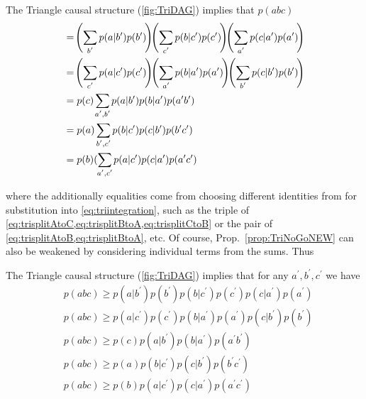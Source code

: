 \begin{proposition}\label{prop:TriNoGoNEW}The Triangle causal structure (\cref{fig:TriDAG}) implies that $p(abc)$
\begin{align*}
&=\!\left(\sum\limits_{\mathclap{b^{\prime}}}
p(a|b^{\prime})p(b^{\prime})
\!\right)\!\!\left(\sum\limits_{\mathclap{c^{\prime}}}
p(b|c^{\prime})p(c^{\prime})
\!\right)\!\!
\left(\sum\limits_{\mathclap{a^{\prime}}}
p(c|a^{\prime})p(a^{\prime})
\!\right)\\
&=\!\left(\sum\limits_{\mathclap{c^{\prime}}}
p(a|c^{\prime})p(c^{\prime})
\!\right)\!\!\left(\sum\limits_{\mathclap{a^{\prime}}}
p(b|a^{\prime})p(a^{\prime})
\!\right)\!\!
\left(\sum\limits_{\mathclap{b^{\prime}}}
p(c|b^{\prime})p(b^{\prime})
\!\right)\\
&=p(c)\sum\limits_{\mathclap{a^{\prime},b^{\prime}}}
p(a|b^{\prime})p(b|a^{\prime})p(a^{\prime}b^{\prime})\\
&=p(a)\sum\limits_{\mathclap{b^{\prime},c^{\prime}}}
p(b|c^{\prime})p(c|b^{\prime})p(b^{\prime}c^{\prime})\\
&=p(b)(\sum\limits_{\mathclap{a^{\prime},c^{\prime}}}
p(a|c^{\prime})p(c|a^{\prime})p(a^{\prime}c^{\prime})
\end{align*}
\end{proposition}
where the additionally equalities come from choosing different identities from  for substitution into \cref{eq:triintegration}, such as the triple of \cref{eq:trisplitAtoC,eq:trisplitBtoA,eq:trisplitCtoB} or the pair of \cref{eq:trisplitAtoB,eq:trisplitBtoA}, etc.
Of course, Prop.~\ref{prop:TriNoGoNEW} can also be weakened by considering individual terms from the sums. Thus
\begin{corollary}\label{cor:TriNoGoNEW}The Triangle causal structure (\cref{fig:TriDAG}) implies that for any ${a^{\prime},b^{\prime},c^{\prime}}$ we have %
\begin{align*}
&p(abc) \geq p(a|b^{\prime})p(b^{\prime})p(b|c^{\prime})p(c^{\prime})p(c|a^{\prime})p(a^{\prime})\\
&p(abc) \geq p(a|c^{\prime})p(c^{\prime})p(b|a^{\prime})p(a^{\prime})p(c|b^{\prime})p(b^{\prime})\\
&p(abc) \geq p(c)p(a|b^{\prime})p(b|a^{\prime})p(a^{\prime}b^{\prime})\\
&p(abc) \geq p(a)p(b|c^{\prime})p(c|b^{\prime})p(b^{\prime}c^{\prime})\\
&p(abc) \geq p(b)p(a|c^{\prime})p(c|a^{\prime})p(a^{\prime}c^{\prime})
\end{align*}
\end{corollary}

